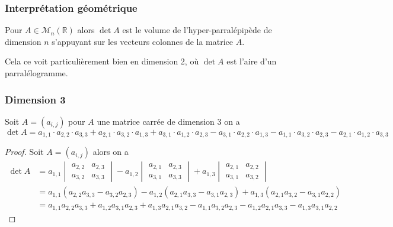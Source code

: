 \documentclass[11pt,colorlinks]{book}
\theoremstyle{mytheoremstyle}
\theoremstyle{mytheoremstyle}
\theoremstyle{mytheoremstyle}
\theoremstyle{mytheoremstyle}
\theoremstyle{mytheoremstyle}
\theoremstyle{mytheoremstyle}
\theoremstyle{mytheoremstyle}
\theoremstyle{mytheoremstyle}
\theoremstyle{myproblemstyle}
\def\mbb#1{\mathbb{#1}}
\def\bR{\mbb{R}}
\begin{document}
\subsubsection{Interprétation géométrique}
\begin{definition}
  Pour $A \in \mathcal{M}_{n}(\bR)$ alors $\det A$ est le volume de l'hyper-parralépipède de dimension $n$ s'appuyant sur les vecteurs colonnes de la matrice $A$.
  \begin{rmq}
    Cela ce voit particulièrement bien en dimension 2, où $\det A$ est l'aire d'un parralélogramme.
  \end{rmq}
\end{definition}
\subsubsection{Dimension 3}
\begin{definition}
  Soit $A = (a_{i,j})$ pour $A$ une matrice carrée de dimension $3$ on a 
  \begin{equation*}
    \det A = a_{1,1} \cdot a_{2,2} \cdot a_{3,3} + a_{2,1} \cdot a_{3,2} \cdot a_{1,3} + 
    a_{3,1} \cdot a_{1,2} \cdot a_{2,3} -
    a_{3,1} \cdot a_{2,2} \cdot a_{1,3} - 
    a_{1,1} \cdot a_{3,2} \cdot a_{2,3} -
    a_{2,1} \cdot a_{1,2} \cdot a_{3,3}
  \end{equation*}
  \begin{proof}
    Soit $A = (a_{i,j})$ alors on a 
    \begin{align*}
      \det A &= a_{1,1} \begin{vmatrix}
        a_{2,2} & a_{2,3} \\ 
        a_{3,2} & a_{3,3}
      \end{vmatrix} -
      a_{1,2} \begin{vmatrix}
        a_{2,1} & a_{2,3} \\ 
        a_{3,1} & a_{3,3} 
      \end{vmatrix} + 
      a_{1,3} \begin{vmatrix}
        a_{2,1} & a_{2,2} \\ 
        a_{3,1} & a_{3,2}
      \end{vmatrix} \\ 
      &= a_{1,1} (a_{2,2}a_{3,3} - a_{3,2}a_{2,3}) - a_{1,2} (a_{2,1}a_{3,3} - a_{3,1}a_{2,3}) + a_{1,3} (a_{2,1}a_{3,2} - a_{3,1}a_{2,2}) \\ 
      &= a_{1,1}a_{2,2}a_{3,3} + a_{1,2}a_{3,1}a_{2,3} + a_{1,3}a_{2,1}a_{3,2} - a_{1,1}a_{3,2}a_{2,3} - a_{1,2}a_{2,1}a_{3,3} - a_{1,3}a_{3,1}a_{2,2}
    \end{align*}
  \end{proof}
\end{definition}
\end{document}
